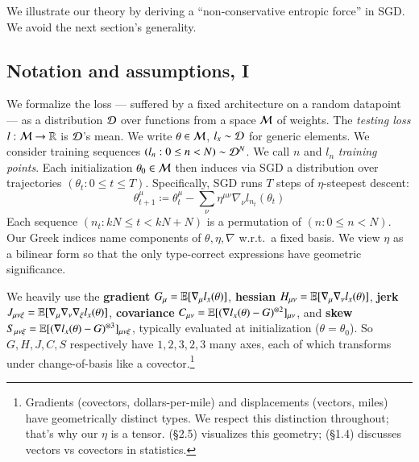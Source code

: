   We illustrate our theory by deriving a ``non-conservative
entropic force'' in SGD.  We avoid the next section's generality.

\subsection{Notation and assumptions, I}\label{sect:setup}

  We formalize the loss --- suffered by a fixed architecture on a random
datapoint --- as a distribution $\mathcal{D}$ over functions from a space $\mathcal{M}$ of
weights.  The \emph{testing loss} $l:\mathcal{M}\to\mathbb{R}$ is $\mathcal{D}$'s mean.  We write
$\theta\in\mathcal{M}$, $l_x\sim\mathcal{D}$ for generic elements.
%
We consider training sequences $(l_n: 0\leq n<N) \sim \mathcal{D}^N$.  We call
$n$ and $l_n$ \emph{training points}.
%
Each initialization $\theta_0 \in \mathcal{M}$ then induces via SGD a
distribution over trajectories $(\theta_t: 0\leq t \leq T)$.  Specifically,
SGD runs $T$ steps of $\eta$-steepest descent:
  \begin{equation*}
    \theta_{t+1}^\mu
    \coloneqq
    \theta_t^\mu -
    \sum_{\nu}
    \eta^{\mu\nu} \nabla_\nu l_{n_t}(\theta_t)
  \end{equation*}
Each sequence $(n_t: kN\leq t<kN+N)$ is a permutation of $(n:
0\leq n<N)$.  Our Greek indices name components of
$\theta,\eta,\nabla$ w.r.t.\ a fixed basis.  We view $\eta$
as a bilinear form
so that the only type-correct expressions have geometric significance.
%

We heavily use the
\textbf{gradient} $G_\mu = \mathbb{E}[\nabla_\mu l_x(\theta)]$, %
\textbf{hessian} $H_{\mu\nu} = \mathbb{E}[\nabla_\mu\nabla_\nu l_x(\theta)]$, %
\textbf{jerk} \squish $J_{\mu\nu\xi} = \mathbb{E}[\nabla_\mu\nabla_\nu\nabla_\xi l_x(\theta)]$, %
\textbf{covariance} $C_{\mu\nu} = \mathbb{E}[(\nabla l_x(\theta) - G)^{\otimes 2}]_{\mu\nu}$, %
and
\textbf{skew} \squash $S_{\mu\nu\xi} = \mathbb{E}[(\nabla l_x(\theta) - G)^{\otimes 3}]_{\mu\nu\xi}$, %
typically evaluated at
initialization ($\theta=\theta_0$).
So $G, H, J, C, S$ respectively have $1, 2, 3, 2, 3$ many axes, each of which
transforms under change-of-basis like a covector.\footnote{
    Gradients
    (covectors, dollars-per-mile) and displacements (vectors, miles) have geometrically
    distinct types.  We respect this distinction throughout; that's
    why our $\eta$ is a tensor.
    \cite{mi73} (\S2.5) visualizes this geometry;
    \cite{cu87} (\S1.4) discusses vectors vs covectors in statistics.
}

